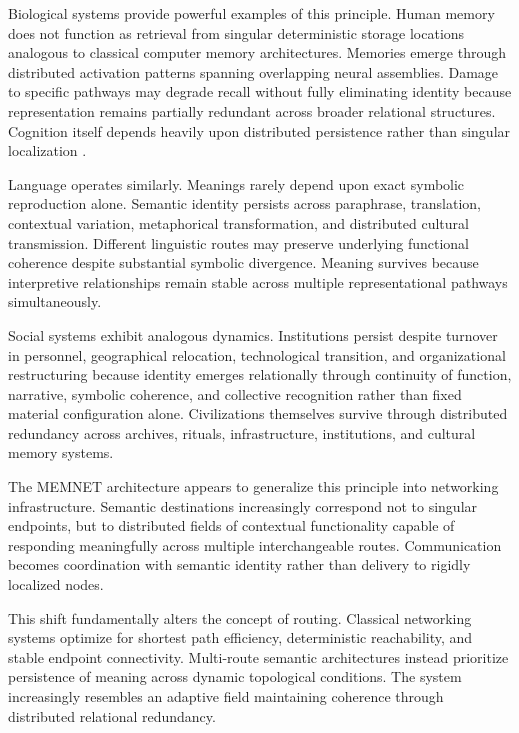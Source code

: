 \documentclass[11pt,a4paper]{article}
\begin{document}
Biological systems provide powerful examples of this principle. Human memory does not function as retrieval from singular deterministic storage locations analogous to classical computer memory architectures. Memories emerge through distributed activation patterns spanning overlapping neural assemblies. Damage to specific pathways may degrade recall without fully eliminating identity because representation remains partially redundant across broader relational structures. Cognition itself depends heavily upon distributed persistence rather than singular localization \cite{hutchins1995}.

Language operates similarly. Meanings rarely depend upon exact symbolic reproduction alone. Semantic identity persists across paraphrase, translation, contextual variation, metaphorical transformation, and distributed cultural transmission. Different linguistic routes may preserve underlying functional coherence despite substantial symbolic divergence. Meaning survives because interpretive relationships remain stable across multiple representational pathways simultaneously.

Social systems exhibit analogous dynamics. Institutions persist despite turnover in personnel, geographical relocation, technological transition, and organizational restructuring because identity emerges relationally through continuity of function, narrative, symbolic coherence, and collective recognition rather than fixed material configuration alone. Civilizations themselves survive through distributed redundancy across archives, rituals, infrastructure, institutions, and cultural memory systems.

The MEMNET architecture appears to generalize this principle into networking infrastructure. Semantic destinations increasingly correspond not to singular endpoints, but to distributed fields of contextual functionality capable of responding meaningfully across multiple interchangeable routes. Communication becomes coordination with semantic identity rather than delivery to rigidly localized nodes.

This shift fundamentally alters the concept of routing. Classical networking systems optimize for shortest path efficiency, deterministic reachability, and stable endpoint connectivity. Multi-route semantic architectures instead prioritize persistence of meaning across dynamic topological conditions. The system increasingly resembles an adaptive field maintaining coherence through distributed relational redundancy.
\end{document}
